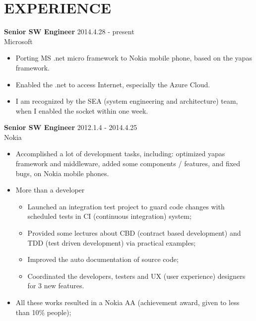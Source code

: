 
\section{EXPERIENCE}
\textbf{Senior SW Engineer} \hfill 2014.4.28 - present\\
        Microsoft
        \begin{itemize}  \itemsep -2pt %
                \item Porting MS .net micro framework to Nokia mobile phone, based on the yapas framework.
                \item Enabled the .net to access Internet, especially the Azure Cloud.
                \item I am recognized by the SEA (system engineering and architecture) team, when I enabled the socket within one week.
        \end{itemize}

\textbf{Senior SW Engineer} \hfill 2012.1.4 - 2014.4.25\\
        Nokia
        \begin{itemize}  \itemsep -2pt %
        \item Accomplished a lot of development tasks, including:
            optimized yapas framework and middleware, added some components / features, and fixed bugs,
        on Nokia mobile phones.
        \item More than a developer 
            \begin{itemize}  \itemsep -2pt
                \item Launched an integration test project to guard code changes
                with scheduled tests in CI (continuous integration) system;
                \item Provided some lectures about CBD (contract based development) and
                TDD (test driven development) via practical examples;
                \item Improved the auto documentation of source code;
                \item Coordinated the developers, testers and UX (user experience) designers for 3 new features.
            \end{itemize}
        \item All these works resulted in a Nokia AA (achievement award, given to less than 10\% people);
        \end{itemize}

